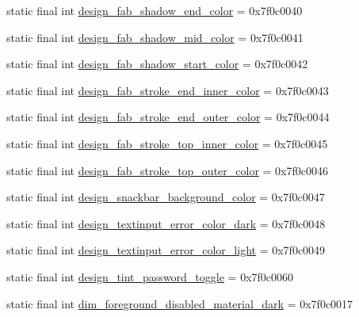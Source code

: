 \begin{CompactItemize}
static final int \hyperlink{classandroid_1_1support_1_1v7_1_1palette_1_1_r_1_1color_111c56d1a712c6d9d74275f70facaf81}{design\_\-fab\_\-shadow\_\-end\_\-color} = 0x7f0c0040
\item 
static final int \hyperlink{classandroid_1_1support_1_1v7_1_1palette_1_1_r_1_1color_90dd1d5c2edd6239bf92616a11fcce8d}{design\_\-fab\_\-shadow\_\-mid\_\-color} = 0x7f0c0041
\item 
static final int \hyperlink{classandroid_1_1support_1_1v7_1_1palette_1_1_r_1_1color_93635aa8bf31bcff5defedc5b48bb023}{design\_\-fab\_\-shadow\_\-start\_\-color} = 0x7f0c0042
\item 
static final int \hyperlink{classandroid_1_1support_1_1v7_1_1palette_1_1_r_1_1color_60cf161287b253978185b4e9a4ab83da}{design\_\-fab\_\-stroke\_\-end\_\-inner\_\-color} = 0x7f0c0043
\item 
static final int \hyperlink{classandroid_1_1support_1_1v7_1_1palette_1_1_r_1_1color_ccbc73762abfe6e43097e19719c9f6a8}{design\_\-fab\_\-stroke\_\-end\_\-outer\_\-color} = 0x7f0c0044
\item 
static final int \hyperlink{classandroid_1_1support_1_1v7_1_1palette_1_1_r_1_1color_9274cd842e6a0d6b9a51ec38096eb61b}{design\_\-fab\_\-stroke\_\-top\_\-inner\_\-color} = 0x7f0c0045
\item 
static final int \hyperlink{classandroid_1_1support_1_1v7_1_1palette_1_1_r_1_1color_1c1ea28e0459b28708485db1211182bf}{design\_\-fab\_\-stroke\_\-top\_\-outer\_\-color} = 0x7f0c0046
\item 
static final int \hyperlink{classandroid_1_1support_1_1v7_1_1palette_1_1_r_1_1color_2bdee87a4c90146bc6a72af48678ee31}{design\_\-snackbar\_\-background\_\-color} = 0x7f0c0047
\item 
static final int \hyperlink{classandroid_1_1support_1_1v7_1_1palette_1_1_r_1_1color_7dc4cd7b8b43c22e15a76835efc6b246}{design\_\-textinput\_\-error\_\-color\_\-dark} = 0x7f0c0048
\item 
static final int \hyperlink{classandroid_1_1support_1_1v7_1_1palette_1_1_r_1_1color_b8632e6457bec1b46e4df865074c94ef}{design\_\-textinput\_\-error\_\-color\_\-light} = 0x7f0c0049
\item 
static final int \hyperlink{classandroid_1_1support_1_1v7_1_1palette_1_1_r_1_1color_eedd846ff2cc30253d4853cd0d566319}{design\_\-tint\_\-password\_\-toggle} = 0x7f0c0060
\item 
static final int \hyperlink{classandroid_1_1support_1_1v7_1_1palette_1_1_r_1_1color_10b659baf4bc4f6b9b1ec8bc590adbe5}{dim\_\-foreground\_\-disabled\_\-material\_\-dark} = 0x7f0c0017

\end{CompactItemize}
